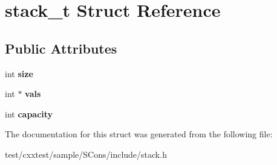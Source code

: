 \hypertarget{structstack__t}{\section{stack\-\_\-t Struct Reference}
\label{structstack__t}
}
\subsection*{Public Attributes}
\begin{DoxyCompactItemize}
\item 
\hypertarget{structstack__t_a93edec9fe6f7af45ecc802555a60e4e6}{int {\bfseries size}}\label{structstack__t_a93edec9fe6f7af45ecc802555a60e4e6}

\item 
\hypertarget{structstack__t_a8604cbf8970588bc7681e5e6d7db4160}{int $\ast$ {\bfseries vals}}\label{structstack__t_a8604cbf8970588bc7681e5e6d7db4160}

\item 
\hypertarget{structstack__t_af8044871a12b9520ceda4ec84b26e047}{int {\bfseries capacity}}\label{structstack__t_af8044871a12b9520ceda4ec84b26e047}

\end{DoxyCompactItemize}


The documentation for this struct was generated from the following file\-:\begin{DoxyCompactItemize}
\item 
test/cxxtest/sample/\-S\-Cons/include/stack.\-h\end{DoxyCompactItemize}
